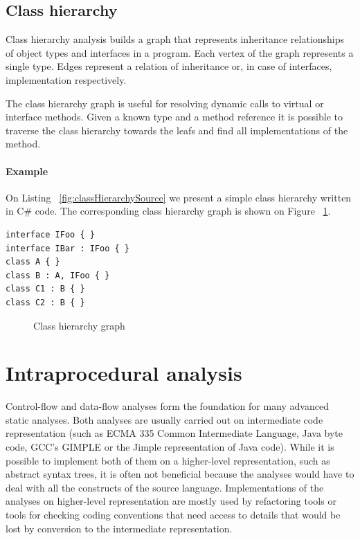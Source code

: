 \subsection{Class hierarchy}
Class hierarchy analysis builds a graph that represents inheritance relationships of object types and interfaces in a program. Each vertex of the graph represents a single type. Edges represent a relation of inheritance or, in case of interfaces, implementation respectively.

The class hierarchy graph is useful for resolving dynamic calls to virtual or interface methods. Given a known type and a method reference it is possible to traverse the class hierarchy towards the leafs and find all implementations of the method.

\paragraph{Example} On Listing ~\ref{fig:classHierarchySource} we present a simple class hierarchy written in C\# code. The corresponding class hierarchy graph is shown on Figure ~\ref{fig:classHierarchyGraph}.

\begin{lstlisting}[language=CSharp,caption=C\# representation of type hierarchy,label=fig:classHierarchySource]
interface IFoo { }  
interface IBar : IFoo { }
class A { }
class B : A, IFoo { }
class C1 : B { }
class C2 : B { }
\end{lstlisting}

\begin{figure}[h]
\begin{center}
\caption{Class hierarchy graph}
\label{fig:classHierarchyGraph}
\end{center}
\end{figure}

\section{Intraprocedural analysis}

Control-flow and data-flow analyses form the foundation for many advanced static analyses. Both analyses are usually carried out on intermediate code representation (such as ECMA 335 Common Intermediate Language, Java byte code, GCC's GIMPLE or the Jimple representation of Java code). While it is possible to implement both of them on a higher-level representation, such as abstract syntax trees, it is often not beneficial because the analyses would have to deal with all the constructs of the source language. Implementations of the analyses on higher-level representation are mostly used by refactoring tools or tools for checking coding conventions that need access to details that would be lost by conversion to the intermediate representation.

